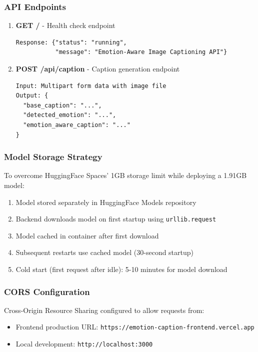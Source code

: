 \documentclass[12pt]{article}
\begin{document}
\subsubsection{API Endpoints}
\begin{enumerate}
\item \textbf{GET /} - Health check endpoint
\begin{verbatim}
Response: {"status": "running", 
           "message": "Emotion-Aware Image Captioning API"}
\end{verbatim}

\item \textbf{POST /api/caption} - Caption generation endpoint
\begin{verbatim}
Input: Multipart form data with image file
Output: {
  "base_caption": "...",
  "detected_emotion": "...",
  "emotion_aware_caption": "..."
}
\end{verbatim}
\end{enumerate}

\subsubsection{Model Storage Strategy}
To overcome HuggingFace Spaces' 1GB storage limit while deploying a 1.91GB model:
\begin{enumerate}
\item Model stored separately in HuggingFace Models repository
\item Backend downloads model on first startup using \texttt{urllib.request}
\item Model cached in container after first download
\item Subsequent restarts use cached model (30-second startup)
\item Cold start (first request after idle): 5-10 minutes for model download
\end{enumerate}

\subsubsection{CORS Configuration}
Cross-Origin Resource Sharing configured to allow requests from:
\begin{itemize}
\item Frontend production URL: \texttt{https://emotion-caption-frontend.vercel.app}
\item Local development: \texttt{http://localhost:3000}
\end{itemize}
\end{document}
